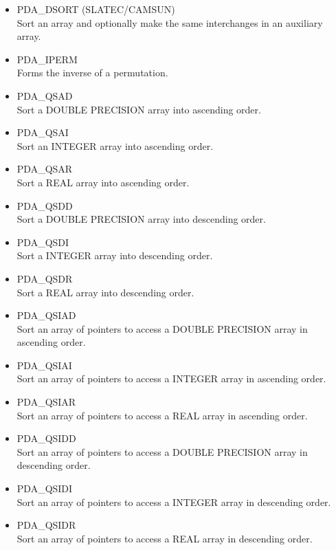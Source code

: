 \documentclass[11pt,twoside]{article}
\newcommand{\htmlref}[2]{#1}
\begin{document}
\begin{itemize}

\item \htmlref{PDA\_DSORT}{PDA\_DSORT} (SLATEC/CAMSUN)\\
   Sort an array and optionally make the same interchanges in
   an auxiliary array.

\item \htmlref{PDA\_IPERM}{PDA\_IPERM}\\
   Forms the inverse of a permutation.

\item \htmlref{PDA\_QSAD}{PDA\_QSAx}\\
   Sort a DOUBLE PRECISION array into ascending order.
\item \htmlref{PDA\_QSAI}{PDA\_QSAx}\\
   Sort an INTEGER array into ascending order.
\item \htmlref{PDA\_QSAR}{PDA\_QSAx}\\
   Sort a REAL array into ascending order.
\item \htmlref{PDA\_QSDD}{PDA\_QSDx}\\
   Sort a DOUBLE PRECISION array into descending order.
\item \htmlref{PDA\_QSDI}{PDA\_QSDx}\\
   Sort a INTEGER array into descending order.
\item \htmlref{PDA\_QSDR}{PDA\_QSDx}\\
   Sort a REAL array into descending order.
\item \htmlref{PDA\_QSIAD}{PDA\_QSIAx}\\
   Sort an array of pointers to access a DOUBLE PRECISION array
   in ascending order.
\item \htmlref{PDA\_QSIAI}{PDA\_QSIAx}\\
   Sort an array of pointers to access a INTEGER array
   in ascending order.
\item \htmlref{PDA\_QSIAR}{PDA\_QSIAx}\\
   Sort an array of pointers to access a REAL array
   in ascending order.
\item \htmlref{PDA\_QSIDD}{PDA\_QSIDx}\\
   Sort an array of pointers to access a DOUBLE PRECISION array in
   descending order.
\item \htmlref{PDA\_QSIDI}{PDA\_QSIDx}\\
   Sort an array of pointers to access a INTEGER array in
   descending order.
\item \htmlref{PDA\_QSIDR}{PDA\_QSIDx}\\
   Sort an array of pointers to access a REAL array in
   descending order.


\end{itemize}
\end{document}
